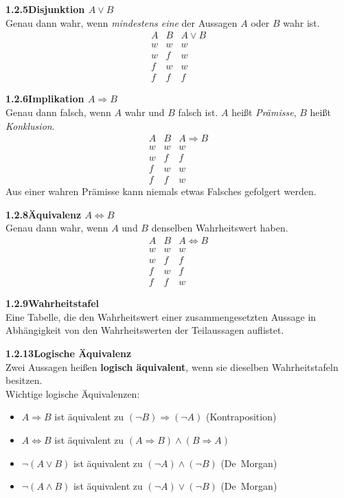 \documentclass[a4paper,12pt]{article}
\newcommand{\gentry}[3]{%
  \noindent\textbf{#1\quad #2}\nopagebreak\\[0.2em]
  #3\par\smallskip
}
\begin{document}
\gentry{1.2.5}{Disjunktion $A \lor B$}{%
  Genau dann wahr, wenn \emph{mindestens eine} der Aussagen $A$ oder $B$
  wahr ist.
  \[
    \begin{array}{cc|c}
      A & B & A \lor B \\\hline
      w & w & w \\ w & f & w \\ f & w & w \\ f & f & f
    \end{array}
  \]
}

\gentry{1.2.6}{Implikation $A \Rightarrow B$}{%
  Genau dann falsch, wenn $A$ wahr und $B$ falsch ist. $A$ heißt
  \emph{Prämisse}, $B$ heißt \emph{Konklusion}.
  \[
    \begin{array}{cc|c}
      A & B & A \Rightarrow B \\\hline
      w & w & w \\ w & f & f \\ f & w & w \\ f & f & w
    \end{array}
  \]
  Aus einer wahren Prämisse kann niemals etwas Falsches gefolgert werden.
}

\gentry{1.2.8}{Äquivalenz $A \Leftrightarrow B$}{%
  Genau dann wahr, wenn $A$ und $B$ denselben Wahrheitswert haben.
  \[
    \begin{array}{cc|c}
      A & B & A \Leftrightarrow B \\\hline
      w & w & w \\ w & f & f \\ f & w & f \\ f & f & w
    \end{array}
  \]
}

\gentry{1.2.9}{Wahrheitstafel}{%
  Eine Tabelle, die den Wahrheitswert einer zusammengesetzten Aussage in
  Abhängigkeit von den Wahrheitswerten der Teilaussagen auflistet.
}

\gentry{1.2.13}{Logische Äquivalenz}{%
  Zwei Aussagen heißen \textbf{logisch äquivalent}, wenn sie dieselben
  Wahrheitstafeln besitzen.
  \smallskip\\
  Wichtige logische Äquivalenzen:
  \begin{itemize}[topsep=2pt,itemsep=1pt]
    \item $A \Rightarrow B$ ist äquivalent zu $(\lnot B) \Rightarrow (\lnot A)$
          \quad (Kontraposition)
    \item $A \Leftrightarrow B$ ist äquivalent zu
          $(A \Rightarrow B) \land (B \Rightarrow A)$
    \item $\lnot(A \lor B)$ ist äquivalent zu $(\lnot A) \land (\lnot B)$
          \quad (De~Morgan)
    \item $\lnot(A \land B)$ ist äquivalent zu $(\lnot A) \lor (\lnot B)$
          \quad (De~Morgan)
  \end{itemize}
}
\end{document}
